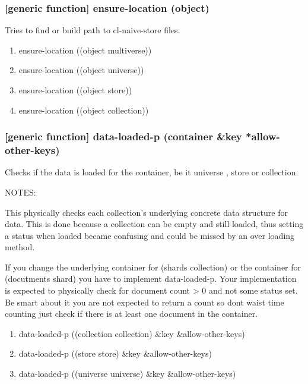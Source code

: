 \documentclass[11pt]{article}
\begin{document}
\subsubsection{[generic function] ensure-location (object)}
\label{sec:org0e888d0}

Tries to find or build path to cl-naive-store files.

\begin{enumerate}
\item ensure-location ((object multiverse))
\label{sec:orgc194c02}
\item ensure-location ((object universe))
\label{sec:org35405bc}
\item ensure-location ((object store))
\label{sec:org0a68c63}
\item ensure-location ((object collection))
\label{sec:org25c9c4d}
\end{enumerate}

\subsubsection{[generic function] data-loaded-p (container \&key *allow-other-keys)}
\label{sec:org0683ada}

Checks if the data is loaded for the container, be it universe , store or collection.

NOTES:

This physically checks each collection's underlying concrete data structure for data. This is done because a collection can be empty and still loaded, thus setting a status when loaded became confusing and could be missed by an over loading method.

If you change the underlying container for (shards collection) or the
container for (docutments shard) you have to implement
data-loaded-p. Your implementation is expected to physically check for
document count > 0 and not some status set. Be smart about it you are
not expected to return a count so dont waist time counting just check
if there is at least one document in the container.


\begin{enumerate}
\item data-loaded-p ((collection collection) \&key \&allow-other-keys)
\label{sec:org64a7f69}

\item data-loaded-p ((store store) \&key \&allow-other-keys)
\label{sec:org5f20865}

\item data-loaded-p ((universe universe) \&key \&allow-other-keys)
\label{sec:org2f81ea9}
\end{enumerate}
\end{document}
